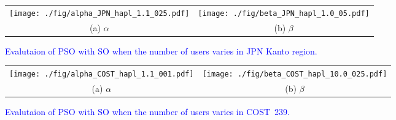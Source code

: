 \documentclass[10pt, letterpaper]{IEEEtran}
\newcommand\blue[1]{\textcolor{blue}{#1}}
\begin{document}
\begin{CJK}{UTF8}{ipxm}
\begin{figure}[tb]
  \begin{center}
      \begin{tabular}{cc}
      \texttt{[image: ./fig/alpha\_JPN\_hapl\_1.1\_025.pdf]} &
      \texttt{[image: ./fig/beta\_JPN\_hapl\_1.0\_05.pdf]} \\
      (a) $\alpha$ & (b) $\beta$
      \end{tabular}
  \end{center}
  \caption{\blue{Evalutaion of PSO with SO when the number of users varies in JPN Kanto region.}}
  \label{fig:OSA_alpha_beta_JPN}
\end{figure}

\begin{figure}[tb]
  \begin{center}
      \begin{tabular}{cc}
      \texttt{[image: ./fig/alpha\_COST\_hapl\_1.1\_001.pdf]} &
      \texttt{[image: ./fig/beta\_COST\_hapl\_10.0\_025.pdf]} \\
      (a) $\alpha$ & (b) $\beta$
      \end{tabular}
  \end{center}
  \caption{\blue{Evalutaion of PSO with SO when the number of users varies in COST~239.}}
  \label{fig:OSA_alpha_beta_COST}
\end{figure}


\end{CJK}
\end{document}
